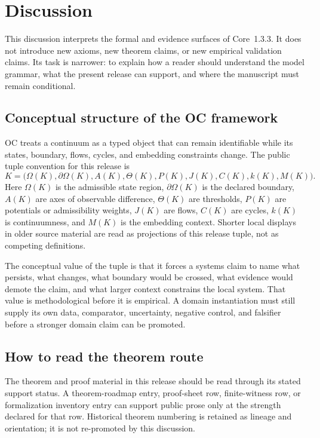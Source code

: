 
\section{Discussion}
\label{sec:discussion}

This discussion interprets the formal and evidence surfaces of Core~1.3.3. It
does not introduce new axioms, new theorem claims, or new empirical validation
claims. Its task is narrower: to explain how a reader should understand the
model grammar, what the present release can support, and where the manuscript
must remain conditional.

\subsection{Conceptual structure of the OC framework}

OC treats a continuum as a typed object that can remain identifiable while its
states, boundary, flows, cycles, and embedding constraints change. The public
tuple convention for this release is
\[
  K=\big(\Omega(K),\partial\Omega(K),A(K),\Theta(K),P(K),J(K),C(K),k(K),M(K)\big).
\]
Here \(\Omega(K)\) is the admissible state region, \(\partial\Omega(K)\) is the
declared boundary, \(A(K)\) are axes of observable difference, \(\Theta(K)\)
are thresholds, \(P(K)\) are potentials or admissibility weights, \(J(K)\) are
flows, \(C(K)\) are cycles, \(k(K)\) is continuumness, and \(M(K)\) is the
embedding context. Shorter local displays in older source material are read as
projections of this release tuple, not as competing definitions.

The conceptual value of the tuple is that it forces a systems claim to name
what persists, what changes, what boundary would be crossed, what evidence
would demote the claim, and what larger context constrains the local system.
That value is methodological before it is empirical. A domain instantiation
must still supply its own data, comparator, uncertainty, negative control, and
falsifier before a stronger domain claim can be promoted.

\subsection{How to read the theorem route}

The theorem and proof material in this release should be read through its stated
support status. A theorem-roadmap entry, proof-sheet row, finite-witness row, or
formalization inventory entry can support public prose only at the strength
declared for that row. Historical theorem numbering is retained as lineage and
orientation; it is not re-promoted by this discussion.

